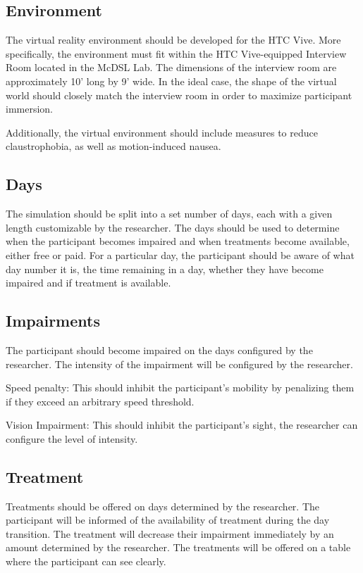 \documentclass{article}
\begin{document}
\subsection{Environment}
The virtual reality environment should be developed for the HTC Vive. More specifically, the environment must fit within the HTC Vive-equipped Interview Room located in the McDSL Lab. The dimensions of the interview room are approximately 10’ long by 9’ wide. In the ideal case, the shape of the virtual world should closely match the interview room in order to maximize participant immersion.

Additionally, the virtual environment should include measures to reduce claustrophobia, as well as motion-induced nausea.

\subsection{Days}
The simulation should be split into a set number of days, each with a given length customizable by the researcher. The days should be used to determine when the participant becomes impaired and when treatments become available, either free or paid. For a particular day, the participant should be aware of what day number it is, the time remaining in a day, whether they have become impaired and if treatment is available.


\subsection{Impairments}
The participant should become impaired on the days configured by the researcher. The intensity of the impairment will be configured by the researcher.

Speed penalty:  This should inhibit the participant's mobility by penalizing them if they exceed an arbitrary speed threshold.

Vision Impairment: This should inhibit the participant’s sight, the researcher can configure the level of intensity.


\subsection{Treatment}
Treatments should be offered on days determined by the researcher. The participant will be informed of the availability of treatment during the day transition. The treatment will decrease their impairment immediately by an amount determined by the researcher. The treatments will be offered on a table where the participant can see clearly. 
\end{document}
